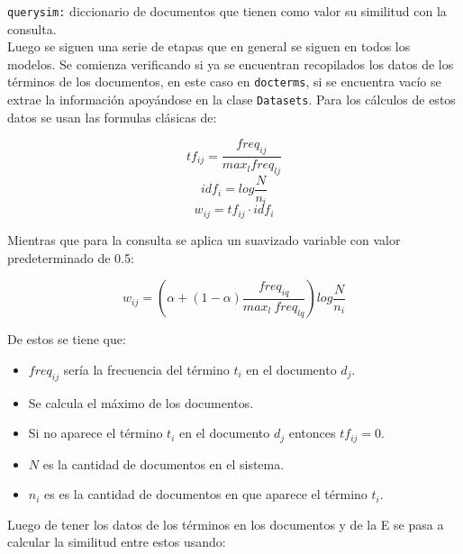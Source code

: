 \documentclass[spanish]{article}
\begin{document}
		\texttt{querysim:} diccionario de documentos que tienen como valor su similitud con la consulta.\\

		Luego se siguen una serie de etapas que en general se siguen en todos los modelos. Se comienza verificando si ya se encuentran recopilados los datos de los términos de los documentos, en este caso en \texttt{docterms}, si se encuentra vacío se extrae la información apoyándose en la clase \texttt{Datasets}. Para los cálculos de estos datos se usan las formulas clásicas de:
			
		\begin{equation}
			\displaystyle tf_{ij} =  \frac{freq_{ij}}{max_l freq_{lj}}
		\end{equation}
		\begin{equation}
			\displaystyle idf_i =  log{\frac{N}{n_i}}
		\end{equation}
		\begin{equation}
			\displaystyle w_{ij} = tf_{ij} \cdot idf_i
		\end{equation}

		Mientras que para la consulta se aplica un suavizado variable con valor predeterminado de 0.5:
		
		\begin{equation}
			\displaystyle w_{ij} = \left( \alpha + 
\left( 1 - \alpha \right) \frac{freq_{iq}}{max_l \ freq_{lq}} \right) log \frac{N}{n_i}
		\end{equation}

		De estos se tiene que:

		\begin{itemize}
			\item $ freq_{ij} $ sería la frecuencia del término $ t_i $ en el documento $ d_j $.

			\item Se calcula el máximo de los documentos.

			\item Si no aparece el término $ t_i $ en el documento $ d_j $ entonces $ tf_{ij} = 0 $.

			\item $ N $ es la cantidad de documentos en el sistema.

			\item $ n_i $ es es la cantidad de documentos en que aparece el término $ t_i $.
		\end{itemize}

		Luego de tener los datos de los términos en los documentos y de la E se pasa a calcular la similitud entre estos usando:
	
\end{document}
